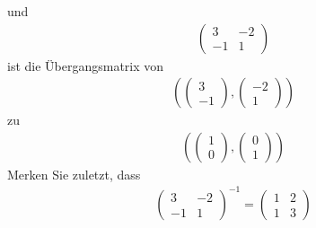 \documentclass[11pt]{report}
\begin{document}
und 
\begin{align}
\begin{pmatrix} 3 & -2 \\ -1 & 1 \end{pmatrix}
\end{align}
ist die Übergangsmatrix von 
\begin{align}
(\begin{pmatrix} 3 \\ -1 \end{pmatrix}, \begin{pmatrix} -2 \\ 1 \end{pmatrix})
\end{align}
zu
\begin{align}
(\begin{pmatrix} 1 \\ 0 \end{pmatrix}, \begin{pmatrix} 0 \\ 1 \end{pmatrix})
\end{align}
Merken Sie zuletzt, dass
\begin{align}
\begin{pmatrix} 3 & -2 \\ -1 & 1 \end{pmatrix}^{-1} = \begin{pmatrix} 1 & 2 \\ 1 & 3 \end{pmatrix}
\end{align}

\newpage
\end{document}
